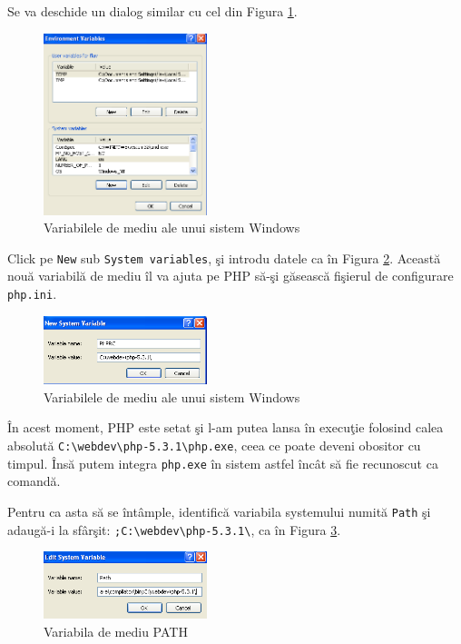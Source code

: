 Se va deschide un dialog similar cu cel din Figura \ref{img:win env vars}.
\begin{figure}[h!]
  \centering
    \includegraphics[width=180px]{cap01/Screenshot-13.png}
  \caption{Variabilele de mediu ale unui sistem Windows}
  \label{img:win env vars}
\end{figure}

Click pe \texttt{New} sub \texttt{System variables}, şi introdu datele ca în
Figura \ref{img:win new env var}. Această nouă variabilă de mediu
îl va ajuta pe PHP să-şi găsească fişierul de configurare \texttt{php.ini}.
\begin{figure}[h!]
  \centering
    \includegraphics[width=180px]{cap01/Screenshot-14.png}
  \caption{Variabilele de mediu ale unui sistem Windows}
  \label{img:win new env var}
\end{figure}

În acest moment, PHP este setat şi l-am putea lansa în execuţie folosind
calea absolută
\texttt{C:{\textbackslash}webdev{\textbackslash}php-5.3.1{\textbackslash}php.exe}, ceea ce
poate deveni obositor cu timpul. Însă putem integra \texttt{php.exe}
în sistem astfel încât să fie recunoscut ca comandă.

Pentru ca asta să
se întâmple, identifică
variabila systemului numită \texttt{Path}
şi adaugă-i la sfârşit:
\texttt{;C:{\textbackslash}webdev{\textbackslash}php-5.3.1{\textbackslash}}, ca în
Figura \ref{img:win env path}.
\begin{figure}[h!]
  \centering
    \includegraphics[width=180px]{cap01/Screenshot-21.png}
  \caption{Variabila de mediu PATH}
  \label{img:win env path}
\end{figure}

